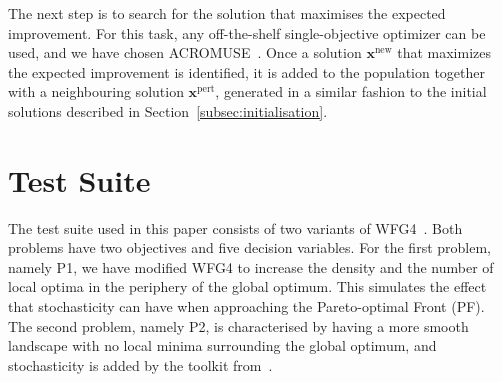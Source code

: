 \documentclass{llncs}
\newcommand{\vx}{\mathbf{x}} %
\begin{document}
The next step is to search for the solution that maximises the expected improvement. For this task, any off-the-shelf single-objective optimizer can be used, and we have chosen ACROMUSE~\cite{Ginley2011}. Once a solution $\vx^\text{new}$ that maximizes the expected improvement is identified, it is added to the population together with a neighbouring solution $\vx^\text{pert}$, generated in a similar fashion to the initial solutions described in Section~\ref{subsec:initialisation}.

\section{Test Suite}\label{sec:test_suite}

The test suite used in this paper consists of two variants of WFG4~\cite{bib:wfg_2006}. Both problems have two objectives and five decision variables. For the first problem, namely P1, we have modified WFG4 to increase the density and the number of local optima in the periphery of the global optimum. This simulates the effect that stochasticity can have when approaching the Pareto-optimal Front (PF). The second problem, namely P2, is characterised by having a more smooth landscape with no local minima surrounding the global optimum, and stochasticity is added by the toolkit from~\cite{Salomon2016Toolkit}.
\end{document}
